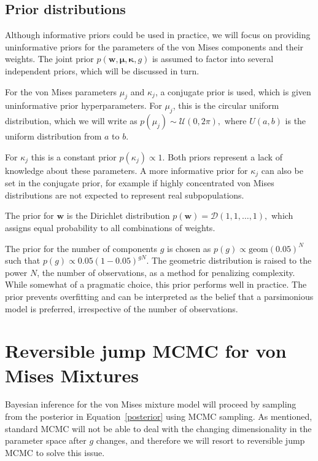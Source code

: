\subsection{Prior distributions} \label{prior-distributions}

Although informative priors could be used in practice, we will focus on providing uninformative priors for the parameters of the von Mises components and their weights. The joint prior $p(\bm{w},\bm\mu,\bm\kappa,g)$ is assumed to factor into several independent priors, which will be discussed in turn. 

For the von Mises parameters $\mu_j$ and $\kappa_j$, a conjugate prior \citep{mardia1976bayesian, guttorp1988finding} is used, which is given uninformative prior hyperparameters. For $\mu_j$, this is the circular uniform distribution, which we will write as $p(\mu_j) \sim \mathcal{U}(0, 2\pi),$ where $U(a, b)$ is the uniform distribution from $a$ to $b$.

For $\kappa_j$ this is a constant prior $p(\kappa_j) \propto 1$.  Both priors represent a lack of knowledge about these parameters. A more informative prior for $\kappa_j$ can also be set in the conjugate prior, for example if highly concentrated von Mises distributions are not expected to represent real subpopulations.

The prior for $\bm w$ is the Dirichlet distribution $p(\bm w) = \mathcal{D}(1, 1, \dotsc, 1),$ which assigns equal probability to all combinations of weights.

The prior for the number of components $g$ is chosen as $p(g) \propto \text{geom}(0.05)^N$ such that $p(g) \propto 0.05(1-0.05)^{g N}$. The geometric distribution is raised to the power $N$, the number of observations, as a method for penalizing complexity. While somewhat of a pragmatic choice, this prior performs well in practice. The prior prevents overfitting and can be interpreted as the belief that a parsimonious model is preferred, irrespective of the number of observations. 




\section{Reversible jump MCMC for von Mises Mixtures}
\label{implementation}

Bayesian inference for the von Mises mixture model will proceed by sampling from the posterior in Equation~\ref{posterior} using MCMC sampling. As mentioned, standard MCMC will not be able to deal with the changing dimensionality in the parameter space after $g$ changes, and therefore we will resort to reversible jump MCMC to solve this issue. 

